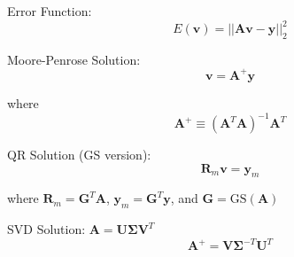 \documentclass[12pt]{article}
\begin{document}
\bigskip\noindent
Error Function:
\[
E(\mathbf{v}) = ||\mathbf{A}\mathbf{v}-\mathbf{y}||_2^2
\tag{8.12}
\]

Moore-Penrose Solution:
\[
 \mathbf{v} =\mathbf{A}^+ \mathbf{y}
 \]

\hspace{1in} where 
\[
\mathbf{A}^+ \equiv  (\mathbf{A}^T\mathbf{A})^{-1} \mathbf{A}^T
\tag{8.25}
\]

\medskip
QR Solution (GS version):
\[
\mathbf{R}_m\mathbf{v} = \mathbf{y}_m 
\tag{8.22}
\]

\bigskip
\hspace{1in} where $\mathbf{R}_m=\mathbf{G}^T \mathbf{A}$, $\mathbf{y}_m=\mathbf{G}^T\mathbf{y}$, and $\mathbf{G}=\text{GS}(\mathbf{A})$

\bigskip\bigskip
SVD Solution: $\mathbf{A}=\mathbf{U}\mathbf{\Sigma}\mathbf{V}^T$
\[
\mathbf{A}^+= \mathbf{V}\mathbf{\Sigma}^{-T}\mathbf{U}^T
\tag{Exercise 8.7}
\]





 
\end{document}
